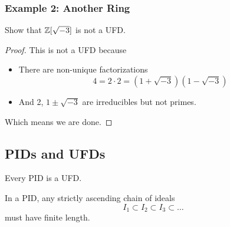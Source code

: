 \documentclass[letterpaper]{article}
\begin{document}
\subsubsection{Example 2: Another Ring}
Show that $\mathbb{Z}[\sqrt{-3}]$ is not a UFD. 

\begin{mdframed}[]
    \begin{proof}
        This is not a UFD because 
        \begin{itemize}
            \item There are non-unique factorizations 
            \[4 = 2 \cdot 2 = (1 + \sqrt{-3})(1 - \sqrt{-3})\]
            \item And 2, $1 \pm \sqrt{-3}$ are irreducibles but not primes.
        \end{itemize}
        Which means we are done. 
    \end{proof}
\end{mdframed}

\subsection{PIDs and UFDs}
\begin{theorem}{}{}
    Every PID is a UFD. 
\end{theorem}

\begin{lemma}{}{}
    In a PID, any strictly ascending chain of ideals 
    \[I_1 \subset I_2 \subset I_3 \subset \dots\]
    must have finite length. 
\end{lemma}
\end{document}
